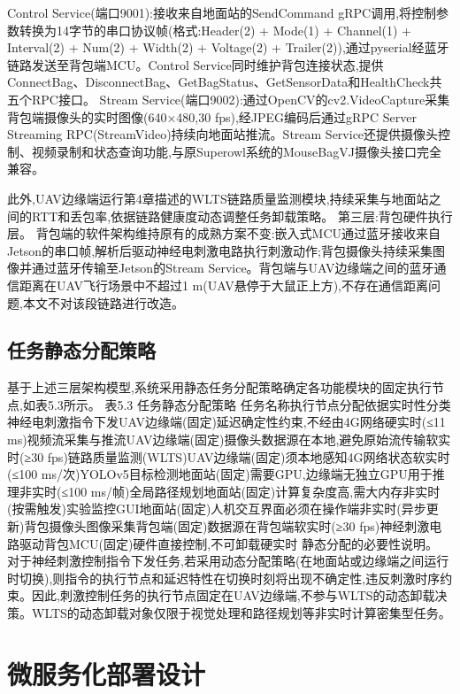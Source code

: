 Control Service(端口9001):接收来自地面站的SendCommand gRPC调用,将控制参数转换为14字节的串口协议帧(格式:Header(2) + Mode(1) + Channel(1) + Interval(2) + Num(2) + Width(2) + Voltage(2) + Trailer(2)),通过pyserial经蓝牙链路发送至背包端MCU。Control Service同时维护背包连接状态,提供ConnectBag、DisconnectBag、GetBagStatus、GetSensorData和HealthCheck共五个RPC接口。
Stream Service(端口9002):通过OpenCV的cv2.VideoCapture采集背包端摄像头的实时图像(640×480,30 fps),经JPEG编码后通过gRPC Server Streaming RPC(StreamVideo)持续向地面站推流。Stream Service还提供摄像头控制、视频录制和状态查询功能,与原Superowl系统的MouseBagVJ摄像头接口完全兼容。

此外,UAV边缘端运行第4章描述的WLTS链路质量监测模块,持续采集与地面站之间的RTT和丢包率,依据链路健康度动态调整任务卸载策略。
第三层:背包硬件执行层。
背包端的软件架构维持原有的成熟方案不变:嵌入式MCU通过蓝牙接收来自Jetson的串口帧,解析后驱动神经电刺激电路执行刺激动作;背包摄像头持续采集图像并通过蓝牙传输至Jetson的Stream Service。背包端与UAV边缘端之间的蓝牙通信距离在UAV飞行场景中不超过1 m(UAV悬停于大鼠正上方),不存在通信距离问题,本文不对该段链路进行改造。

\subsection{任务静态分配策略}

基于上述三层架构模型,系统采用静态任务分配策略确定各功能模块的固定执行节点,如表5.3所示。
表5.3 任务静态分配策略
任务名称执行节点分配依据实时性分类神经电刺激指令下发UAV边缘端(固定)延迟确定性约束,不经由4G网络硬实时(≤11 ms)视频流采集与推流UAV边缘端(固定)摄像头数据源在本地,避免原始流传输软实时(≥30 fps)链路质量监测(WLTS)UAV边缘端(固定)须本地感知4G网络状态软实时(≤100 ms/次)YOLOv5目标检测地面站(固定)需要GPU,边缘端无独立GPU用于推理非实时(≤100 ms/帧)全局路径规划地面站(固定)计算复杂度高,需大内存非实时(按需触发)实验监控GUI地面站(固定)人机交互界面必须在操作端非实时(异步更新)背包摄像头图像采集背包端(固定)数据源在背包端软实时(≥30 fps)神经刺激电路驱动背包MCU(固定)硬件直接控制,不可卸载硬实时
静态分配的必要性说明。 对于神经刺激控制指令下发任务,若采用动态分配策略(在地面站或边缘端之间运行时切换),则指令的执行节点和延迟特性在切换时刻将出现不确定性,违反刺激时序约束。因此,刺激控制任务的执行节点固定在UAV边缘端,不参与WLTS的动态卸载决策。WLTS的动态卸载对象仅限于视觉处理和路径规划等非实时计算密集型任务。

\section{微服务化部署设计}
